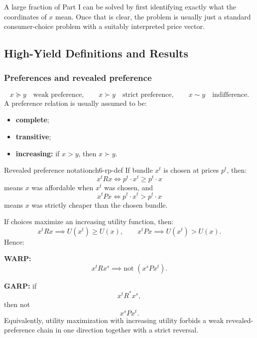 \begin{examtip}
A large fraction of Part I can be solved by first identifying exactly what the coordinates of $x$ mean. Once that is clear, the problem is usually just a standard consumer-choice problem with a suitably interpreted price vector.
\end{examtip}

\subsection{High-Yield Definitions and Results}

\subsubsection{Preferences and revealed preference}

\begin{keyformula}[title={Key Formula: preference language}]
\[
x \succeq y \quad \text{weak preference}, \qquad
x \succ y \quad \text{strict preference}, \qquad
x \sim y \quad \text{indifference}.
\]
A preference relation is usually assumed to be:
\begin{itemize}
    \item \textbf{complete};
    \item \textbf{transitive};
    \item \textbf{increasing:} if $x>y$, then $x\succ y$.
\end{itemize}
\end{keyformula}

\begin{definition}{Revealed preference notation}{ch6-rp-def}
If bundle $x^t$ is chosen at prices $p^t$, then:
\[
x^t R x
\iff
p^t \cdot x^t \ge p^t \cdot x
\]
means $x$ was affordable when $x^t$ was chosen, and
\[
x^t P x
\iff
p^t \cdot x^t > p^t \cdot x
\]
means $x$ was strictly cheaper than the chosen bundle.
\end{definition}

\begin{keyformula}[title={Key Formula: WARP and GARP}]
If choices maximize an increasing utility function, then:
\[
x^t R x \implies U(x^t)\ge U(x),
\qquad
x^t P x \implies U(x^t)>U(x).
\]
Hence:

\textbf{WARP:}
\[
x^t R x^s \implies \text{not }(x^s P x^t).
\]

\textbf{GARP:}
if
\[
x^t R^* x^s,
\]
then not
\[
x^s P x^t.
\]
Equivalently, utility maximization with increasing utility forbids a weak revealed-preference chain in one direction together with a strict reversal.
\end{keyformula}

